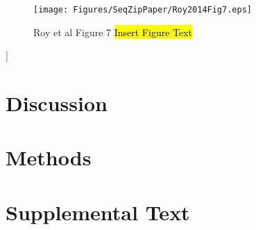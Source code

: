 		\begin{figure}[htbp] %
			\centering 
			\texttt{[image: Figures/SeqZipPaper/Roy2014Fig7.eps]}
			\caption[SeqZip Diagram]
			{
				Roy et al Figure 7
				\hl{Insert Figure Text}
				}
			\label{fig:Roy2014 F7}
			\end{figure}]
			
\section{Discussion}\label{c2sec: Discussion}

\section{Methods}\label{c2sec: Methods}

\section{Supplemental Text}\label{c1sec: Supplemental Text}


